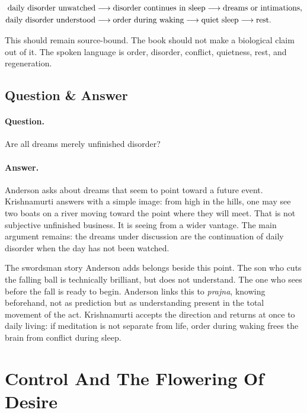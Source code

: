 \documentclass[11pt,oneside]{book}
\begin{document}
\begin{align}
\hbox{daily disorder unwatched}
&\longrightarrow
\hbox{disorder continues in sleep}
\longrightarrow
\hbox{dreams or intimations},\\
\hbox{daily disorder understood}
&\longrightarrow
\hbox{order during waking}
\longrightarrow
\hbox{quiet sleep}
\longrightarrow
\hbox{rest}.
\end{align}

This should remain source-bound. The book should not make a biological claim out of it. The spoken language is order, disorder, conflict, quietness, rest, and regeneration.

\subsection{Question \& Answer}

\paragraph{Question.}
Are all dreams merely unfinished disorder?

\paragraph{Answer.}
Anderson asks about dreams that seem to point toward a future event. Krishnamurti answers with a simple image: from high in the hills, one may see two boats on a river moving toward the point where they will meet. That is not subjective unfinished business. It is seeing from a wider vantage. The main argument remains: the dreams under discussion are the continuation of daily disorder when the day has not been watched.

The swordsman story Anderson adds belongs beside this point. The son who cuts the falling ball is technically brilliant, but does not understand. The one who sees before the fall is ready to begin. Anderson links this to \emph{prajna}, knowing beforehand, not as prediction but as understanding present in the total movement of the act. Krishnamurti accepts the direction and returns at once to daily living: if meditation is not separate from life, order during waking frees the brain from conflict during sleep.

\section{Control And The Flowering Of Desire}
\end{document}
